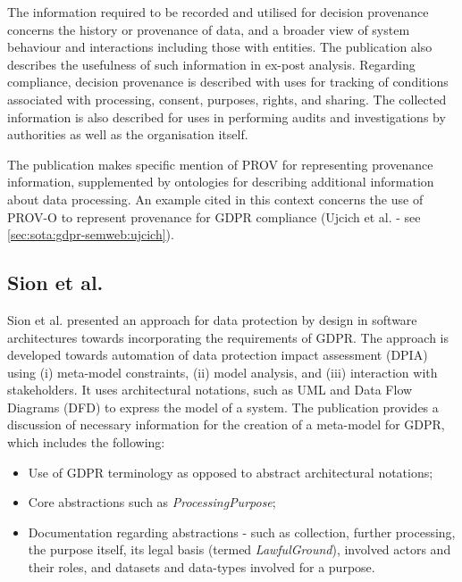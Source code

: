 The information required to be recorded and utilised for decision provenance concerns the history or provenance of data, and a broader view of system behaviour and interactions including those with entities. The publication also describes the usefulness of such information in ex-post analysis.
Regarding compliance, decision provenance is described with uses for tracking of conditions associated with processing, consent, purposes, rights, and sharing.
The collected information is also described for uses in performing audits and investigations by authorities as well as the organisation itself.

The publication makes specific mention of PROV \cite{lebo_prov-o_2013} for representing provenance information, supplemented by ontologies for describing additional information about data processing.
An example cited in this context concerns the use of PROV-O to represent provenance for GDPR compliance (Ujcich et al. \cite{belhajjame_provenance_2018} - see \autoref{sec:sota:gdpr-semweb:ujcich}).

\subsection*{Sion et al.}
Sion et al. \cite{sion_architectural_2019} presented an approach for data protection by design in software architectures towards incorporating the requirements of GDPR. The approach is developed towards automation of data protection impact assessment (DPIA) using (i) meta-model constraints, (ii) model analysis, and  (iii) interaction with stakeholders. It uses architectural notations, such as UML and Data Flow Diagrams (DFD) to express the model of a system.  The publication provides a discussion of necessary information for the creation of a meta-model for GDPR, which includes the following:
\begin{itemize}
    \item Use of GDPR terminology as opposed to abstract architectural notations; 
    \item Core abstractions such as \textit{ProcessingPurpose};
    \item Documentation regarding abstractions - such as collection, further processing, the purpose itself, its legal basis (termed \textit{LawfulGround}), involved actors and their roles, and datasets and data-types involved for a purpose.
\end{itemize}

